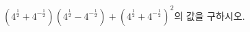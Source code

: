 $(4^{\frac{1}{2}}+4^{-\frac{1}{2}})(4^{\frac{1}{2}}-4^{-\frac{1}{2}})+(4^{\frac{1}{2}}+4^{-\frac{1}{2}})^2$의 값을 구하시오.
